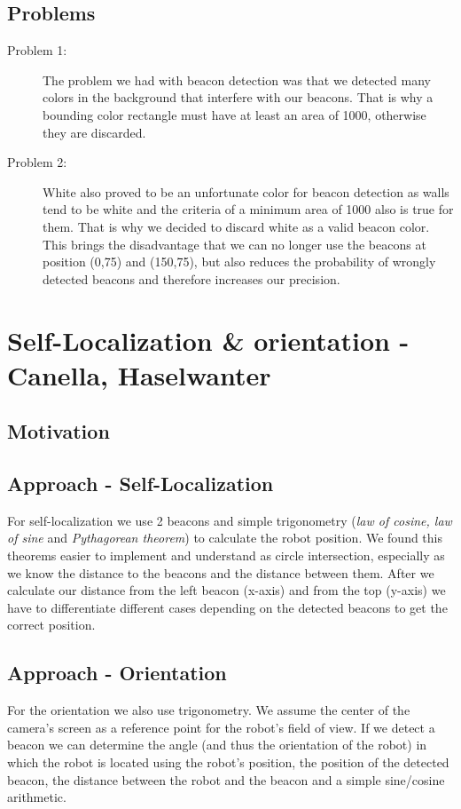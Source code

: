 \documentclass[703031]{iisreport}
\begin{document}
\subsection{Problems}
	\begin{description}
		\item [Problem 1:] The problem we had with beacon detection was that we detected many colors in the background that interfere with our beacons. That is why a bounding color rectangle must have at least an area of 1000, otherwise they are discarded.
		\item [Problem 2:] White also proved to be an unfortunate color for beacon detection as walls tend to be white and the criteria of a minimum area of 1000 also is true for them. That is why we decided to discard white as a valid beacon color. This brings the disadvantage that we can no longer use the beacons at position (0,75) and (150,75), but also reduces the probability of wrongly detected beacons and therefore increases our precision.
	\end{description}


\section{Self-Localization \& orientation -\\ Canella, Haselwanter}
\subsection{Motivation}

\subsection{Approach - Self-Localization}
For self-localization we use 2 beacons and simple trigonometry (\emph{law of cosine, law of sine} and \emph{Pythagorean theorem}) to calculate the robot position. We found this theorems easier to implement and understand as circle intersection, especially as we know the distance to the beacons and the distance between them. After we calculate our distance from the left beacon (x-axis) and from the top (y-axis) we have to differentiate different cases depending on the detected beacons to get the correct position.

\subsection{Approach - Orientation}
For the orientation we also use trigonometry. We assume the center of the camera's screen as a reference point for the robot's field of view. If we detect a beacon we can determine the angle (and thus the orientation of the robot) in which the robot is located using the robot's position, the position of the detected beacon, the distance between the robot and the beacon and a simple sine/cosine arithmetic.
\end{document}
